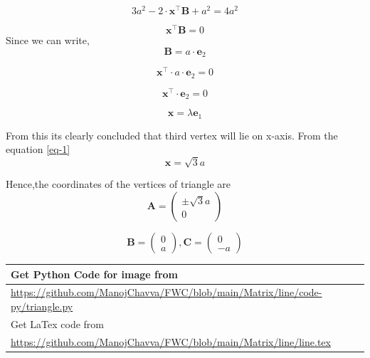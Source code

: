\documentclass[journal,12pt,twocolumn]{IEEEtran}
\let\vec\mathbf
\begin{document}
\begin{equation}
3a^2 - 2\cdot \vec{x}^\top \vec{B} + a^2 = 4a^2
\end{equation}

\begin{equation}
\vec{x}^\top \vec{B} = 0
\end{equation}
\noindent Since we can write, \begin{equation}
\vec{B} = a \cdot \vec{e}_2
\end{equation}

\begin{equation}
\vec{x}^\top \cdot a \cdot \vec{e}_2 = 0
\end{equation}

\begin{equation}
\vec{x}^\top \cdot \vec{e}_2 = 0
\end{equation}

\begin{equation}
\vec{x} = \lambda \vec{e}_1
\end{equation}

\noindent From this its clearly concluded that third vertex will lie on x-axis. 
\noindent From the equation \eqref{eq-1} 
\begin{equation}
\vec{x} = \sqrt{3}{a}
\end{equation}


\noindent Hence,the coordinates of the vertices of triangle are 
  \begin{equation*}
\vec{A} = 
   \begin{pmatrix}
   \pm\sqrt{3}a \\ 0
 \end{pmatrix}
 \end{equation*}

\begin{equation}
\vec{B}=\begin{pmatrix} 
0\\
a
\end{pmatrix}, {
\vec{C}=\begin{pmatrix} 
0\\
-a
\end{pmatrix} }
\end{equation}



\begin{table}[h]
\large
\begin{tabular}{lll}
\multicolumn{3}{l}{Get Python Code for image from}                                                 \\ \hline
\multicolumn{3}{|l|}{\url{https://github.com/ManojChavva/FWC/blob/main/Matrix/line/code-py/triangle.py}} \\ 
 \hline
\multicolumn{3}{l}{Get LaTex code from}                                                            \\ \hline
\multicolumn{3}{|l|}{\url{https://github.com/ManojChavva/FWC/blob/main/Matrix/line/line.tex}}            \\ \hline
\end{tabular}
\end{table}
\end{document}

